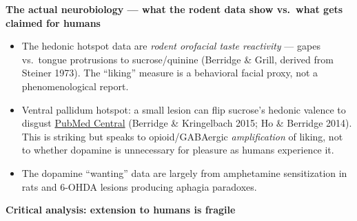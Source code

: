 \textbf{The actual neurobiology --- what the rodent data show vs.~what gets claimed for humans}

\begin{itemize}
\tightlist
\item
  The hedonic hotspot data are \emph{rodent orofacial taste reactivity} --- gapes vs.~tongue protrusions to sucrose/quinine (Berridge \& Grill, derived from Steiner 1973). The ``liking'' measure is a behavioral facial proxy, not a phenomenological report.
\item
  Ventral pallidum hotspot: a small lesion can flip sucrose's hedonic valence to disgust \href{https://pmc.ncbi.nlm.nih.gov/articles/PMC5171207/}{PubMed Central} (Berridge \& Kringelbach 2015; Ho \& Berridge 2014). This is striking but speaks to opioid/GABAergic \emph{amplification} of liking, not to whether dopamine is unnecessary for pleasure as humans experience it.
\item
  The dopamine ``wanting'' data are largely from amphetamine sensitization in rats and 6-OHDA lesions producing aphagia paradoxes.
\end{itemize}

\textbf{Critical analysis: extension to humans is fragile}

